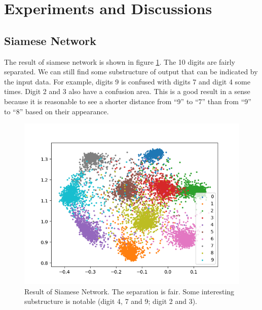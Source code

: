 \documentclass[10pt,twocolumn,letterpaper]{article}
\begin{document}
	\section{Experiments and Discussions \label{sec:Res}}
		\subsection{Siamese Network}
			The result of siamese network is shown in figure \ref{fig:siamese}. The 10 digits are fairly separated. We can still find some substructure of output that can be indicated by the input data. For example, digits 9 is confused with digits 7 and digit 4 some times. Digit 2 and 3 also have a confusion area. This is a good result in a sense because it is reasonable to see a shorter distance from ``9'' to ``7'' than from ``9'' to ``8'' based on their appearance.
			\begin{figure}[htbp]
				\begin{center}
					\includegraphics[width=0.9\linewidth]{siamese}
				\end{center}
				\caption{Result of Siamese Network. The separation is fair. Some interesting substructure is notable (digit 4, 7 and 9; digit 2 and 3).\label{fig:siamese}}
			\end{figure}	
\end{document}
